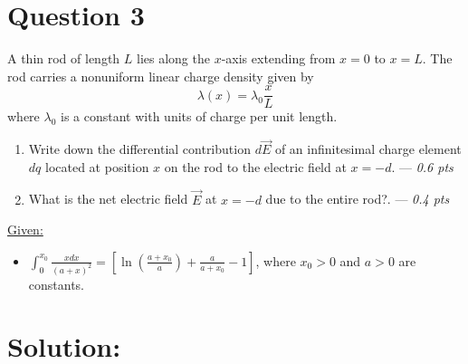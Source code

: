 \section*{Question 3}


A thin rod of length $L$ lies along the $x$-axis extending from $x = 0$ to $x = L$. The rod carries a nonuniform linear charge density given by
\begin{equation*}
    \lambda(x) = \lambda_0 \frac{x}{L}
\end{equation*}
where $\lambda_0$ is a constant with units of charge per unit length.
\begin{center}
\end{center}

\begin{enumerate}
    \item[(a)] Write down the differential contribution $d\vec{E}$ of an infinitesimal charge element $dq$ located at position $x$ on the rod to the electric field at $x=-d$. --- \textit{0.6 pts}
    \item[(b)] What is the net electric field $\vec{E}$ at $x=-d$ due to the entire rod?. --- \textit{0.4 pts}
\end{enumerate}

\underline{Given:}
\begin{itemize}
    \item $\int_{0}^{x_0} \frac{x dx}{(a+x)^2} = \left[ \ln\left(\frac{a+x_0}{a}\right) + \frac{a}{a+x_0} -1 \right]$, where $x_0>0$ and $a>0$ are constants.
\end{itemize}



\section*{Solution:}

